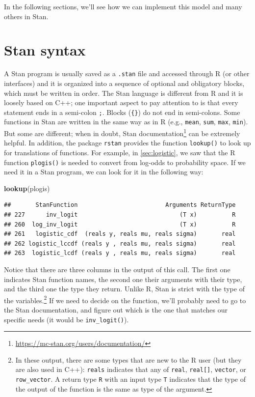 \documentclass[12pt,]{krantz}
\newenvironment{Shaded}{\begin{snugshade}}{\end{snugshade}}
\newcommand{\KeywordTok}[1]{\textcolor[rgb]{0.13,0.29,0.53}{\textbf{#1}}}
\newcommand{\NormalTok}[1]{#1}
\renewcommand{\href}[2]{#2\footnote{\url{#1}}}
\theoremstyle{definition}
\theoremstyle{definition}
\theoremstyle{definition}
\theoremstyle{remark}
\begin{document}
In the following sections, we'll see how we can implement this model and
many others in Stan.

\section{Stan syntax}\label{stan-syntax}

A Stan program is usually saved as a \texttt{.stan} file and accessed
through R (or other interfaces) and it is organized into a sequence of
optional and obligatory blocks, which must be written in order. The Stan
language is different from R and it is loosely based on C++; one
important aspect to pay attention to is that every statement ends in a
semi-colon \texttt{;}. Blocks (\texttt{\{\}}) do not end in semi-colons.
Some functions in Stan are written in the same way as in R (e.g.,
\texttt{mean}, \texttt{sum}, \texttt{max}, \texttt{min}). But some are
different; when in doubt,
\href{https://mc-stan.org/users/documentation/}{Stan documentation} can
be extremely helpful. In addition, the package \texttt{rstan} provides
the function \texttt{lookup()} to look up for translations of functions.
For example, in \ref{sec:logistic}, we saw that the R function
\texttt{plogis()} is needed to convert from log-odds to probability
space. If we need it in a Stan program, we can look for it in the
following way:

\begin{Shaded}
\begin{Highlighting}[]
\KeywordTok{lookup}\NormalTok{(plogis)}
\end{Highlighting}
\end{Shaded}

\begin{verbatim}
##       StanFunction                         Arguments ReturnType
## 227      inv_logit                             (T x)          R
## 260  log_inv_logit                             (T x)          R
## 261   logistic_cdf  (reals y, reals mu, reals sigma)       real
## 262 logistic_lccdf (reals y , reals mu, reals sigma)       real
## 263  logistic_lcdf (reals y , reals mu, reals sigma)       real
\end{verbatim}

Notice that there are three columns in the output of this call. The
first one indicates Stan function names, the second one their arguments
with their type, and the third one the type they return. Unlike R, Stan
is strict with the type of the variables.\footnote{In these output,
  there are some types that are new to the R user (but they are also
  used in C++): \texttt{reals} indicates that any of \texttt{real},
  \texttt{real{[}{]}}, \texttt{vector}, or \texttt{row\_vector}. A
  return type \texttt{R} with an input type \texttt{T} indicates that
  the type of the output of the function is the same as type of the
  argument.} If we need to decide on the function, we'll probably need
to go to the Stan documentation, and figure out which is the one that
matches our specific needs (it would be \texttt{inv\_logit()}).
\end{document}
